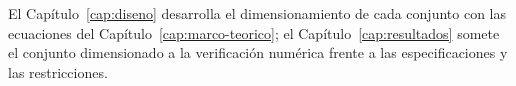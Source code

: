 \endgroup

El Capítulo~\ref{cap:diseno} desarrolla el dimensionamiento de cada conjunto con las ecuaciones del Capítulo~\ref{cap:marco-teorico}; el Capítulo~\ref{cap:resultados} somete el conjunto dimensionado a la verificación numérica frente a las especificaciones y las restricciones.

